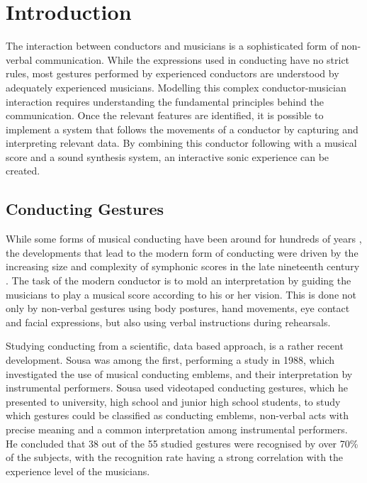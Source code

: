 \chapter{Introduction}
\label{chapter:intro}

The interaction between conductors and musicians
is a sophisticated form of non-verbal communication.
While the expressions used in conducting have no strict rules,
most gestures performed by experienced conductors are understood by
adequately experienced musicians.
Modelling this complex conductor-musician interaction
requires understanding the fundamental principles behind the communication.
Once the relevant features are identified,
it is possible to implement a system that
follows the movements of a conductor
by capturing and interpreting relevant data.
By combining this conductor following with
a musical score and a sound synthesis system,
an interactive sonic experience can be created.

\section{Conducting Gestures}

While some forms of musical conducting have been around for hundreds of years
\cite{modernconductor},
the developments that lead to the modern form of conducting
were driven by the increasing size and complexity of symphonic scores
in the late nineteenth century \cite{gallops2005}.
The task of the modern conductor is to mold an interpretation
by guiding the musicians to play a musical score according to his or her vision.
This is done not only by non-verbal gestures
using body postures, hand movements, eye contact and facial expressions,
but also using verbal instructions during rehearsals.

Studying conducting from a scientific, data based approach,
is a rather recent development.
Sousa \cite{sousa1988} was among the first,
performing a study in 1988,
which investigated the use of musical conducting emblems,
and their interpretation by instrumental performers.
Sousa used videotaped conducting gestures,
which he presented to university, high school and junior high school students,
to study which gestures could be classified as conducting emblems,
non-verbal acts with precise meaning and
a common interpretation among instrumental performers.
He concluded that 38 out of the 55 studied gestures
were recognised by over 70\% of the subjects,
with the recognition rate having a strong correlation
with the experience level of the musicians.

